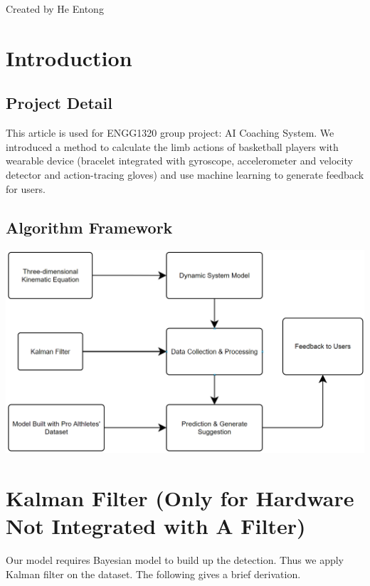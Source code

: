 \documentclass[12pt]{article}
\begin{document}
\noindent
    Created by He Entong
    \tableofcontents
    \newpage
    \section{Introduction}
    \subsection{Project Detail}
    This article is used for ENGG1320 group project: AI Coaching System. We introduced a method to calculate the limb actions of basketball players with wearable device (bracelet integrated with gyroscope, accelerometer and velocity detector and action-tracing gloves) and use machine learning to generate feedback for users.
    \subsection{Algorithm Framework}
    \begin{center}
    \includegraphics[width = \linewidth]{Algorithm Framework_1.png}
    \end{center}
    \section{Kalman Filter (Only for Hardware Not Integrated with A Filter)}
    Our model requires Bayesian model to build up the detection. Thus we apply Kalman filter on the dataset. The following gives a brief derivation.
\end{document}

